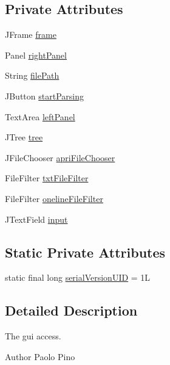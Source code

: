 \subsection*{Private Attributes}
\begin{DoxyCompactItemize}
\item 
J\-Frame \hyperlink{class_home_gui_a0b1781db25b8fdacc8970aa6166b11ad}{frame}
\item 
Panel \hyperlink{class_home_gui_adb0131b6ea64353bf6b0c5993468341c}{right\-Panel}
\item 
String \hyperlink{class_home_gui_a1f9226407f1c2c6ff8d62f84dfcebfbe}{file\-Path}
\item 
J\-Button \hyperlink{class_home_gui_aedb975e31137435a02772599392bf195}{start\-Parsing}
\item 
Text\-Area \hyperlink{class_home_gui_ac6ba89ab2c3204e87ec00b9b4962f327}{left\-Panel}
\item 
J\-Tree \hyperlink{class_home_gui_ab4af4f54e925eedcab3cb87da41410e1}{tree}
\item 
J\-File\-Chooser \hyperlink{class_home_gui_a7b615d195d8208fab52fd9db85082d46}{apri\-File\-Chooser}
\item 
File\-Filter \hyperlink{class_home_gui_af20bf1a94a96e4f53e1f66337a257ce3}{txt\-File\-Filter}
\item 
File\-Filter \hyperlink{class_home_gui_a8b0192c597368a34c855abe70a8a80ec}{oneline\-File\-Filter}
\item 
J\-Text\-Field \hyperlink{class_home_gui_ab33ea273ae2f2c5bde32041076af630c}{input}
\end{DoxyCompactItemize}
\subsection*{Static Private Attributes}
\begin{DoxyCompactItemize}
\item 
static final long \hyperlink{class_home_gui_a6a93dac6b8c89a59ca14536d6f5ad414}{serial\-Version\-U\-I\-D} = 1\-L
\end{DoxyCompactItemize}


\subsection{Detailed Description}
The gui access. 

\begin{DoxyAuthor}{Author}
Paolo Pino 
\end{DoxyAuthor}



